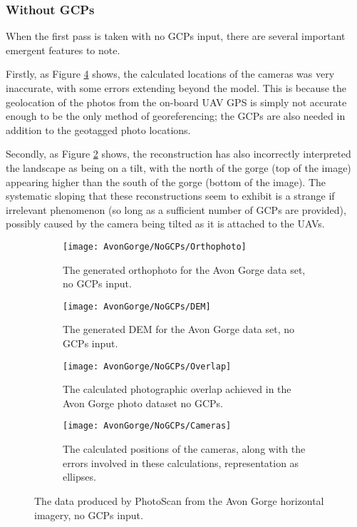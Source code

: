 \subsubsection{Without GCPs}
\label{sec:results/avon-gorge/no-gcps}

When the first pass is taken with no GCPs input, there are several important
emergent features to note.

Firstly, as Figure \ref{img:avon-gorge/no-gcps/cameras} shows, the calculated
locations of the cameras was very inaccurate, with some errors extending beyond
the model. This is because the geolocation of the photos from the on-board UAV
GPS is simply not accurate enough to be the only method of georeferencing; the
GCPs are also needed in addition to the geotagged photo locations.

Secondly, as Figure \ref{img:avon-gorge/no-gcps/dem} shows, the reconstruction
has also incorrectly interpreted the landscape as being on a tilt, with the
north of the gorge (top of the image) appearing higher than the south of the
gorge (bottom of the image). The systematic sloping that these reconstructions
seem to exhibit is a strange if irrelevant phenomenon (so long as a sufficient
number of GCPs are provided), possibly caused by the camera being tilted as it
is attached to the UAVs.

\begin{figure}
    \centering
    \begin{subfigure}[b]{0.24\textwidth}
        \texttt{[image: AvonGorge/NoGCPs/Orthophoto]}
        \caption{The generated orthophoto for the Avon Gorge data set, no
        GCPs input.}
        \label{img:avon-gorge/no-gcps/orthophoto}
    \end{subfigure}
    \begin{subfigure}[b]{0.24\textwidth}
        \texttt{[image: AvonGorge/NoGCPs/DEM]}
        \caption{The generated DEM for the Avon Gorge data set, no GCPs input.}
        \label{img:avon-gorge/no-gcps/dem}
    \end{subfigure}
    \begin{subfigure}[b]{0.24\textwidth}
        \texttt{[image: AvonGorge/NoGCPs/Overlap]}
        \caption{The calculated photographic overlap achieved in the Avon Gorge
        photo dataset no GCPs.}
        \label{img:avon-gorge/no-gcps/overlap}
    \end{subfigure}
    \begin{subfigure}[b]{0.24\textwidth}
        \texttt{[image: AvonGorge/NoGCPs/Cameras]}
        \caption{The calculated positions of the cameras, along with the errors
        involved in these calculations, representation as ellipses.}
        \label{img:avon-gorge/no-gcps/cameras}
    \end{subfigure}
    \caption{The data produced by PhotoScan from the Avon Gorge horizontal
    imagery, no GCPs input.}
    \label{img:avon-gorge/no-gcps}
\end{figure}

